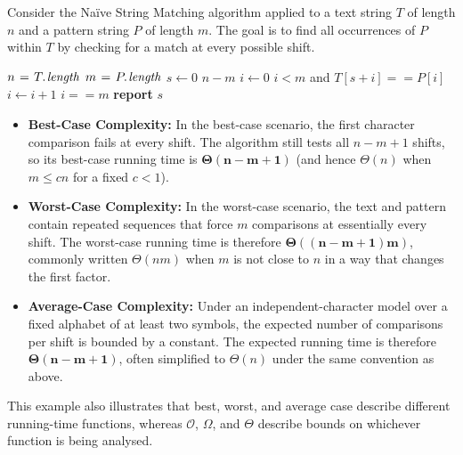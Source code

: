 \begin{example}

    Consider the Naïve String Matching algorithm applied to a text string $T$ of length $n$ and a pattern string $P$ of length $m$. The goal is to find all occurrences of $P$ within $T$ by checking for a match at every possible shift.
    
    \begin{codebox}
        \li $n \gets \attrib{T}{length}$
        \li $m \gets \attrib{P}{length}$
        \li \For $s \gets 0$ \To $n - m$ \Do
        \li     $i \gets 0$
        \li     \While $i < m$ and $T[s + i] == P[i]$ \Do
        \li         $i \gets i + 1$
                \End
        \li     \If $i == m$ \Then
        \li         \textbf{report} $s$ 
                \End
            \End
    \end{codebox}
    
    \begin{itemize}
        \item \textbf{Best-Case Complexity: }  
        In the best-case scenario, the first character comparison fails at every shift. The algorithm still tests all $n-m+1$ shifts, so its best-case running time is $\boldsymbol{\Theta(n-m+1)}$ (and hence $\Theta(n)$ when $m\leq cn$ for a fixed $c<1$).
    
        \item \textbf{Worst-Case Complexity: }
        In the worst-case scenario, the text and pattern contain repeated sequences that force $m$ comparisons at essentially every shift. The worst-case running time is therefore $\boldsymbol{\Theta((n-m+1)m)}$, commonly written $\Theta(nm)$ when $m$ is not close to $n$ in a way that changes the first factor.
    
        \item \textbf{Average-Case Complexity: } 
        Under an independent-character model over a fixed alphabet of at least two symbols, the expected number of comparisons per shift is bounded by a constant. The expected running time is therefore $\boldsymbol{\Theta(n-m+1)}$, often simplified to $\Theta(n)$ under the same convention as above.
    \end{itemize}
   
    
    This example also illustrates that best, worst, and average case describe different running-time functions, whereas $\mathcal{O}$, $\Omega$, and $\Theta$ describe bounds on whichever function is being analysed.
    
    \end{example}

